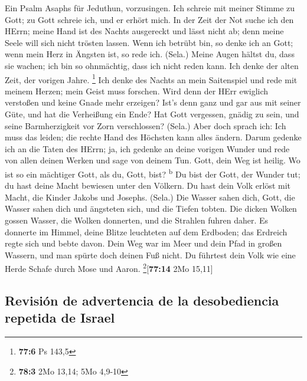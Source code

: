  Ein Psalm Asaphs für Jeduthun, vorzusingen.
 Ich schreie mit meiner Stimme zu Gott; zu Gott schreie
ich, und er erhört mich.  In der Zeit der Not suche ich
den HErrn; meine Hand ist des Nachts ausgereckt und lässt nicht ab; denn
meine Seele will sich nicht trösten lassen.  Wenn ich
betrübt bin, so denke ich an Gott; wenn mein Herz in Ängsten ist, so
rede ich. (Sela.)  Meine Augen hältst du, dass sie wachen;
ich bin so ohnmächtig, dass ich nicht reden kann.  Ich
denke der alten Zeit, der vorigen Jahre. \footnote{\textbf{77:6} Ps
  143,5}  Ich denke des Nachts an mein Saitenspiel und
rede mit meinem Herzen; mein Geist muss forschen.  Wird
denn der HErr ewiglich verstoßen und keine Gnade mehr erzeigen?
 Ist's denn ganz und gar aus mit seiner Güte, und hat die
Verheißung ein Ende?  Hat Gott vergessen, gnädig zu sein,
und seine Barmherzigkeit vor Zorn verschlossen? (Sela.) 
Aber doch sprach ich: Ich muss das leiden; die rechte Hand des Höchsten
kann alles ändern.  Darum gedenke ich an die Taten des
HErrn; ja, ich gedenke an deine vorigen Wunder  und rede
von allen deinen Werken und sage von deinem Tun.  Gott,
dein Weg ist heilig. Wo ist so ein mächtiger Gott, als du, Gott, bist?
\textsuperscript{b}  Du bist der Gott, der Wunder tut; du
hast deine Macht bewiesen unter den Völkern.  Du hast
dein Volk erlöst mit Macht, die Kinder Jakobs und Josephs. (Sela.)
 Die Wasser sahen dich, Gott, die Wasser sahen dich und
ängsteten sich, und die Tiefen tobten.  Die dicken Wolken
gossen Wasser, die Wolken donnerten, und die Strahlen fuhren daher.
 Es donnerte im Himmel, deine Blitze leuchteten auf dem
Erdboden; das Erdreich regte sich und bebte davon.  Dein
Weg war im Meer und dein Pfad in großen Wassern, und man spürte doch
deinen Fuß nicht.  Du führtest dein Volk wie eine Herde
Schafe durch Mose und Aaron. \footnote{\textbf{78:3} 2Mo 13,14; 5Mo
  4,9-10}{[}\textbf{77:14} 2Mo 15,11{]}

\hypertarget{revisiuxf3n-de-advertencia-de-la-desobediencia-repetida-de-israel}{%
\subsection{Revisión de advertencia de la desobediencia repetida de
Israel}\label{revisiuxf3n-de-advertencia-de-la-desobediencia-repetida-de-israel}}

